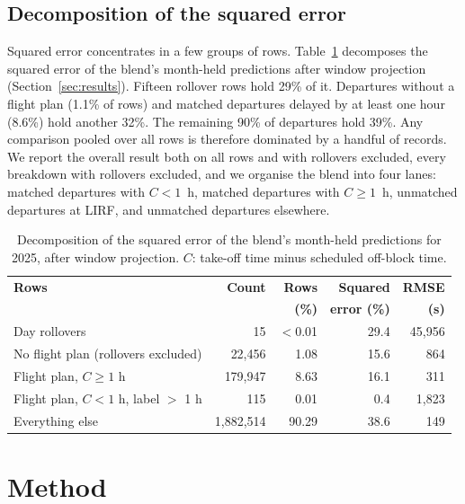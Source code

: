 \documentclass[
  manuscript=article,  %
  layout=preprint,  %
  year=20xx,
  volume=x,
]{extra/joas}
\begin{document}
\subsection{Decomposition of the squared error}
\label{sec:errorshare}

Squared error concentrates in a few groups of rows. Table~\ref{tb:errorshare} decomposes the squared error of the blend's month-held predictions after window projection (Section~\ref{sec:results}). Fifteen rollover rows hold 29\% of it. Departures without a flight plan (1.1\% of rows) and matched departures delayed by at least one hour (8.6\%) hold another 32\%. The remaining 90\% of departures hold 39\%. Any comparison pooled over all rows is therefore dominated by a handful of records. We report the overall result both on all rows and with rollovers excluded, every breakdown with rollovers excluded, and we organise the blend into four lanes: matched departures with $C<1$~h, matched departures with $C \geq 1$~h, unmatched departures at LIRF, and unmatched departures elsewhere.

\begin{table}[htbp!]
  \centering
  \small
  \caption{Decomposition of the squared error of the blend's month-held predictions for 2025, after window projection. $C$: take-off time minus scheduled off-block time.}
  \label{tb:errorshare}
  \begin{tabular}{lrrrr}
  \toprule
  \textbf{Rows} & \textbf{Count} & \textbf{Rows} & \textbf{Squared} & \textbf{RMSE} \\
  & & \textbf{(\%)} & \textbf{error (\%)} & \textbf{(s)} \\
  \midrule
  Day rollovers & 15 & $<$0.01 & 29.4 & 45,956 \\
  No flight plan (rollovers excluded) & 22,456 & 1.08 & 15.6 & 864 \\
  Flight plan, $C \geq 1$ h & 179,947 & 8.63 & 16.1 & 311 \\
  Flight plan, $C < 1$ h, label $>$ 1 h & 115 & 0.01 & 0.4 & 1,823 \\
  Everything else & 1,882,514 & 90.29 & 38.6 & 149 \\
  \bottomrule
  \end{tabular}
\end{table}


\section{Method}
\label{sec:method}
\end{document}
